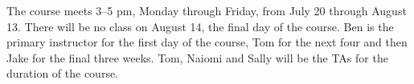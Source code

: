 The course meets 3--5 pm, Monday through Friday, from July 20 through
August 13. There will be no class on August 14, the final day of the course.
Ben is the primary instructor for the first day of the course, Tom for the next four and then Jake for the final three weeks. Tom, Naiomi and Sally will be the TAs for the duration of the course.


